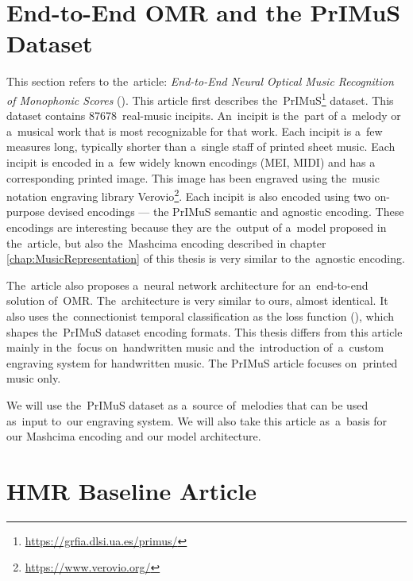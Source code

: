 \section{End-to-End OMR and the PrIMuS Dataset}

This section refers to the~article: \emph{End-to-End Neural Optical Music Recognition of Monophonic Scores} (\cite{Primus}). This article first describes the~PrIMuS\footnote{\href{https://grfia.dlsi.ua.es/primus/}{https://grfia.dlsi.ua.es/primus/}} dataset. This dataset contains 87678~real-music incipits. An~incipit is the~part of a~melody or a~musical work that is most recognizable for that work. Each incipit is a~few measures long, typically shorter than a~single staff of printed sheet music. Each incipit is encoded in a~few widely known encodings (MEI, MIDI) and has a corresponding printed image. This image has been engraved using the~music notation engraving library Verovio\footnote{\href{https://www.verovio.org/}{https://www.verovio.org/}}. Each incipit is also encoded using two on-purpose devised encodings --- the PrIMuS semantic and agnostic encoding. These encodings are interesting because they are the~output of a~model proposed in the~article, but also the~Mashcima encoding described in chapter \ref{chap:MusicRepresentation} of this thesis is very similar to the~agnostic encoding.

The~article also proposes a~neural network architecture for an~end-to-end solution of~OMR. The~architecture is very similar to ours, almost identical. It also uses the~connectionist temporal classification as the loss function (\cite{CTC}), which shapes the~PrIMuS dataset encoding formats. This thesis differs from this article mainly in the~focus on~handwritten music and the~introduction of~a~custom engraving system for handwritten music. The PrIMuS article focuses on~printed music only.

We will use the~PrIMuS dataset as a~source of~melodies that can be used as~input to~our engraving system. We will also take this article as~a~basis for our Mashcima encoding and our model architecture.


\section{HMR Baseline Article}

